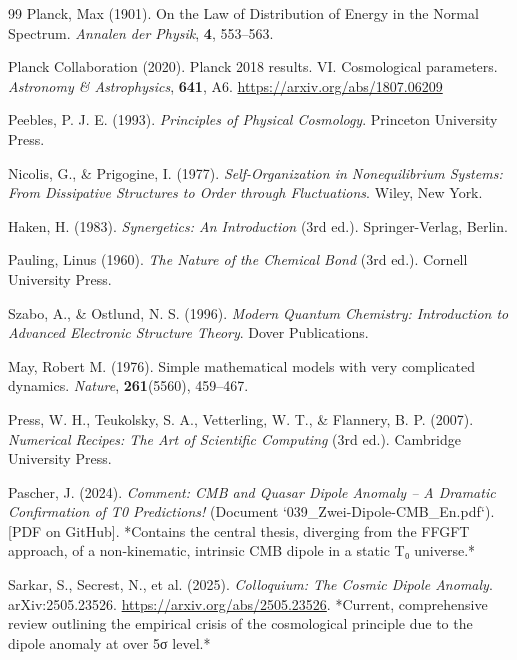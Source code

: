 \begin{thebibliography}{99}
		Planck, Max (1901). On the Law of Distribution of Energy in the Normal Spectrum. 
		\textit{Annalen der Physik}, \textbf{4}, 553--563.
		
		Planck Collaboration (2020). Planck 2018 results. VI. Cosmological parameters. 
		\textit{Astronomy \& Astrophysics}, \textbf{641}, A6.
		\href{https://arxiv.org/abs/1807.06209}{https://arxiv.org/abs/1807.06209}
		
		Peebles, P. J. E. (1993). \textit{Principles of Physical Cosmology}. 
		Princeton University Press.
		
		Nicolis, G., \& Prigogine, I. (1977). \textit{Self-Organization in Nonequilibrium Systems: From Dissipative Structures to Order through Fluctuations}. 
		Wiley, New York.
		
		Haken, H. (1983). \textit{Synergetics: An Introduction} (3rd ed.). 
		Springer-Verlag, Berlin.
		
		Pauling, Linus (1960). \textit{The Nature of the Chemical Bond} (3rd ed.). 
		Cornell University Press.
		
		Szabo, A., \& Ostlund, N. S. (1996). \textit{Modern Quantum Chemistry: Introduction to Advanced Electronic Structure Theory}. 
		Dover Publications.
		
		May, Robert M. (1976). Simple mathematical models with very complicated dynamics. 
		\textit{Nature}, \textbf{261}(5560), 459--467.
		
		Press, W. H., Teukolsky, S. A., Vetterling, W. T., \& Flannery, B. P. (2007). \textit{Numerical Recipes: The Art of Scientific Computing} (3rd ed.). 
		Cambridge University Press.
		
		Pascher, J. (2024). \textit{Comment: CMB and Quasar Dipole Anomaly – A Dramatic Confirmation of T0 Predictions!} (Document `039\_Zwei-Dipole-CMB\_En.pdf`).
		[PDF on GitHub].
		*Contains the central thesis, diverging from the FFGFT approach, of a non-kinematic, intrinsic CMB dipole in a static T₀ universe.*
		
		Sarkar, S., Secrest, N., et al. (2025). \textit{Colloquium: The Cosmic Dipole Anomaly}. 
		arXiv:2505.23526.
		\href{https://arxiv.org/abs/2505.23526}{https://arxiv.org/abs/2505.23526}.
		*Current, comprehensive review outlining the empirical crisis of the cosmological principle due to the dipole anomaly at over 5σ level.*
		

\end{thebibliography}
